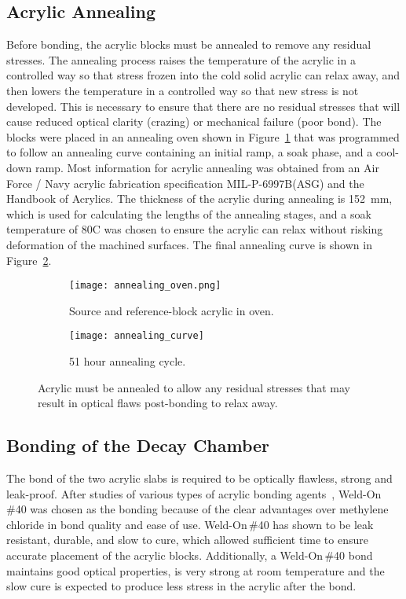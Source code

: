 \subsection{Acrylic Annealing}

Before bonding, the acrylic blocks must be annealed to remove any residual stresses. The annealing process raises the temperature of the acrylic in a controlled way so that stress frozen into the cold solid acrylic can relax away, and then lowers the temperature in a controlled way so that new stress is not developed. This is necessary to ensure that there are no residual stresses that will cause reduced optical clarity (crazing) or mechanical failure (poor bond). The blocks were placed in an annealing oven shown in Figure~\ref{fig:oven} that was programmed to follow an annealing curve containing an initial ramp, a soak phase, and a cool-down ramp. Most information for acrylic annealing was obtained from an Air Force / Navy acrylic fabrication specification MIL-P-6997B(ASG) and the Handbook of Acrylics. The thickness of the acrylic during annealing is 152~mm, which is used for calculating the lengths of the annealing stages, and a soak temperature of 80\degree C was chosen to ensure the acrylic can relax without risking deformation of the machined surfaces. The final annealing curve is shown in Figure~\ref{fig:annealing}.

\begin{figure}
\begin{subfigure}{.54\textwidth}
  \texttt{[image: annealing\_oven.png]}
  \caption{Source and reference-block acrylic in oven.}
  \label{fig:oven}
\end{subfigure}
\begin{subfigure}{.47\textwidth}
  \texttt{[image: annealing\_curve]}
  \caption{51 hour annealing cycle.}
  \label{fig:annealing}
\end{subfigure}
\caption{Acrylic must be annealed to allow any residual stresses that may result in optical flaws post-bonding to relax away.}
\label{fig:annealfig}
\end{figure}

\subsection{Bonding of the Decay Chamber}
\label{sec:bond}

The bond of the two acrylic slabs is required to be optically flawless, strong and leak-proof. 
After studies of various types of acrylic bonding agents~\cite{tanner:2014}, Weld-On\,\#40 was chosen as the bonding because of the clear advantages over methylene chloride in bond quality and ease of use.
Weld-On\,\#40 has shown to be leak resistant, durable, and slow to cure, which allowed sufficient time to ensure accurate placement of the acrylic blocks. 
Additionally, a Weld-On\,\#40 bond maintains good optical properties, is very strong at room temperature and the slow cure is expected to produce less stress in the acrylic after the bond.


